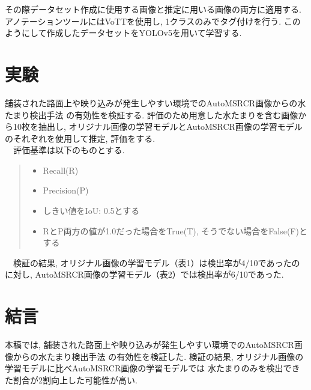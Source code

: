 \documentclass[10pt]{jarticle}
\begin{document}
    その際データセット作成に使用する画像と推定に用いる画像の両方に適用する. 
    アノテーションツールにはVoTTを使用し, 1クラスのみでタグ付けを行う. 
    このようにして作成したデータセットをYOLOv5を用いて学習する. 


    \section{実験}%
    舗装された路面上や映り込みが発生しやすい環境でのAutoMSRCR画像からの水たまり検出手法
    の有効性を検証する. 
    評価のため用意した水たまりを含む画像から10枚を抽出し, 
    オリジナル画像の学習モデルとAutoMSRCR画像の学習モデルのそれぞれを使用して推定, 評価をする. \\
    　評価基準は以下のものとする. 
    \begin{quote}
        \begin{itemize}
         \item Recall(R) 
         \item Precision(P) 
         \item しきい値をIoU: 0.5とする
         \item RとP両方の値が1.0だった場合をTrue(T), 
         そうでない場合をFalse(F)とする
         
        \end{itemize}
       \end{quote}
    　検証の結果, オリジナル画像の学習モデル（表1）は検出率が4/10であったのに対し, 
    AutoMSRCR画像の学習モデル（表2）では検出率が6/10であった. 

    \section{結言}%
    本稿では, 舗装された路面上や映り込みが発生しやすい環境でのAutoMSRCR画像からの水たまり検出手法
    の有効性を検証した. 検証の結果, オリジナル画像の学習モデルに比べAutoMSRCR画像の学習モデルでは
    水たまりのみを検出できた割合が2割向上した可能性が高い. 
     


    



    
    
\end{document}

